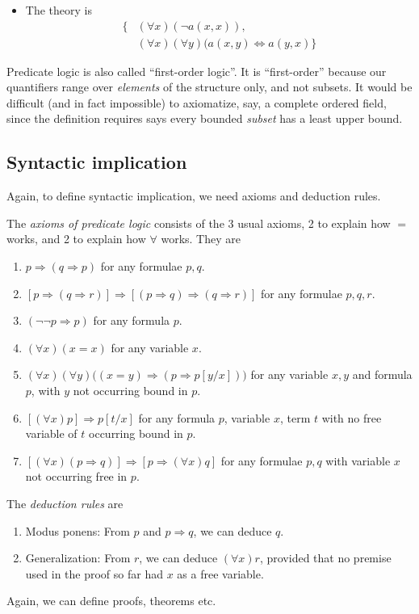 \documentclass[a4paper]{article}
\begin{document}
\begin{eg}
\begin{enumerate}
\begin{itemize}
      \item The theory is
        \begin{align*}
          \{& (\forall x)(\neg a(x, x)),\\
            & (\forall x)(\forall y)(a(x, y)\Leftrightarrow a(y, x)\}
          \end{align*}
    \end{itemize}
\end{enumerate}
Predicate logic is also called ``first-order logic''. It is ``first-order'' because our quantifiers range over \emph{elements} of the structure only, and not subsets. It would be difficult (and in fact impossible) to axiomatize, say, a complete ordered field, since the definition requires says every bounded \emph{subset} has a least upper bound.
\end{eg}

\subsection{Syntactic implication}
Again, to define syntactic implication, we need axioms and deduction rules.
\begin{defi}
  The \emph{axioms of predicate logic} consists of the 3 usual axioms, 2 to explain how $=$ works, and 2 to explain how $\forall$ works. They are
  \begin{enumerate}[label=\arabic{*}.]
    \item $p\Rightarrow (q\Rightarrow p)$ for any formulae $p, q$.
    \item $[p\Rightarrow (q\Rightarrow r)] \Rightarrow [(p\Rightarrow q)\Rightarrow (q\Rightarrow r)]$ for any formulae $p, q, r$.
    \item $(\neg \neg p\Rightarrow p)$ for any formula $p$.
    \item $(\forall x)(x = x)$ for any variable $x$.
    \item $(\forall x)(\forall y)\big((x = y)\Rightarrow (p \Rightarrow p[y/x])\big)$ for any variable $x, y$ and formula $p$, with $y$ not occurring bound in $p$.
    \item $[(\forall x)p] \Rightarrow p[t/x]$ for any formula $p$, variable $x$, term $t$ with no free variable of $t$ occurring bound in $p$.
    \item $[(\forall x)(p\Rightarrow q)]\Rightarrow [p\Rightarrow (\forall x)q]$ for any formulae $p, q$ with variable $x$ not occurring free in $p$.
  \end{enumerate}
  The \emph{deduction rules} are
  \begin{enumerate}[label=\arabic{*}.]
    \item Modus ponens: From $p$ and $p\Rightarrow q$, we can deduce $q$.
    \item Generalization: From $r$, we can deduce $(\forall x)r$, provided that no premise used in the proof so far had $x$ as a free variable.
  \end{enumerate}
\end{defi}
Again, we can define proofs, theorems etc.
\end{document}
